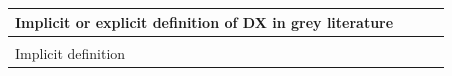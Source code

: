 \documentclass[english, 12pt, a4paper, sci, utf8, a-1b, online]{aaltothesis}
\begin{document}
{\begin{center}
\begin{longtable}{p{0.3\linewidth}p{0.6\linewidth}}
      \multicolumn{2}{l}{\textbf{Implicit or explicit definition of DX in grey literature}}                                                                                                                                                                                                                                                                                                                                                                                                                                                                                                                                                                                                                                                                                                                                                                                                                                                                                                            \\
      \hline                                                                                                                                                                                                                                                                                                                                                                                                                                                                                                                                                                                                                                                                                                                                                                                                                                                                                                                              \\
      Implicit definition & \newline \textcite{great-dx-and-the-people-who-make-them} \newline \textcite{heroku-dx} \newline \textcite{api-developer-experience-dx-resources} \newline \textcite{developer-experience-sanity}                                                                                                                                                                                                                                                                                                                                                                                                                                                                                                                                                                                                                                                                                                             \\

\end{longtable}
\end{center}}
\end{document}
